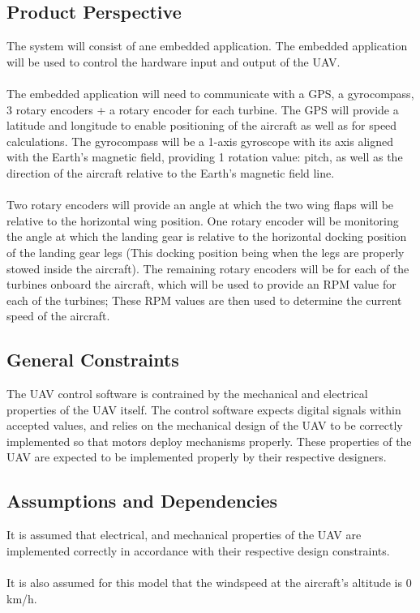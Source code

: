 \documentclass[titlepage]{article}
\begin{document}
\subsection{Product Perspective}
The system will consist of ane embedded application. The embedded application will be used to control the hardware input and output of the UAV.\\\\
The embedded application will need to communicate with a GPS, a gyrocompass, 3 rotary encoders + a rotary encoder for each turbine.
The GPS will provide a latitude and longitude to enable positioning of the aircraft as well as for speed calculations.
The gyrocompass will be a 1-axis gyroscope with its axis aligned with the Earth's magnetic field, providing 1 rotation value: pitch, as well as the direction of the aircraft relative to the Earth's magnetic field line.\\\\
Two rotary encoders will provide an angle at which the two wing flaps will be relative to the horizontal wing position. One rotary encoder will be monitoring the angle at which the landing gear is relative to the horizontal docking position of the landing gear legs (This docking position being when the legs are properly stowed inside the aircraft). The remaining rotary encoders will be for each of the turbines onboard the aircraft, which will be used to provide an RPM value for each of the turbines; These RPM values are then used to determine the current speed of the aircraft.
 
\subsection{General Constraints}
The UAV control software is contrained by the mechanical and electrical properties of the UAV itself.
The control software expects digital signals within accepted values, and relies on the mechanical design of the UAV to be correctly implemented so that motors deploy mechanisms properly. These properties of the UAV are expected to be implemented properly by their respective designers.

\subsection{Assumptions and Dependencies}
It is assumed that electrical, and mechanical properties of the UAV are implemented correctly in accordance with their respective design constraints.\\\\
It is also assumed for this model that the windspeed at the aircraft's altitude is 0 km/h.
\end{document}
